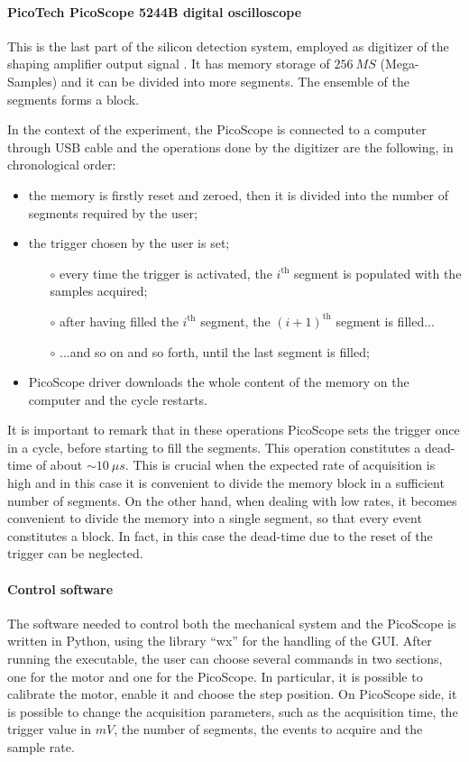 \documentclass[../../main/main.tex]{subfiles}
\begin{document}
\paragraph{PicoTech PicoScope 5244B digital oscilloscope}
This is the last part of the silicon detection system, employed as digitizer of the shaping amplifier output signal \cite{picoscope_5000}. It has memory storage of \( 256 \ \si{MS} \) (Mega-Samples) and it can be divided into more segments. The ensemble of the segments forms a block.

In the context of the experiment, the PicoScope is connected to a computer through USB cable and the operations done by the digitizer are the following, in chronological order:
\begin{itemize}
    \item the memory is firstly reset and zeroed, then it is divided into the number of segments required by the user;
    \item the trigger chosen by the user is set;
    \begin{itemize}[noitemsep,topsep=0pt,parsep=5pt,partopsep=0pt]%
        \item[\( \circ \)] every time the trigger is activated, the \( i^{\text{th}} \) segment is populated with the samples acquired;
        \item[\( \circ \)] after having filled the \( i^{\text{th}} \) segment, the \( (i+1)^{\text{th}} \) segment is filled...
        \item[\( \circ \)] ...and so on and so forth, until the last segment is filled;
    \end{itemize}
    \item PicoScope driver downloads the whole content of the memory on the computer and the cycle restarts.
\end{itemize}
It is important to remark that in these operations PicoScope sets the trigger once in a cycle, before starting to fill the segments. This operation constitutes a dead-time of about \( \sim 10 \ \si{\mu s} \). This is crucial when the expected rate of acquisition is high and in this case it is convenient to divide the memory block in a sufficient number of segments. On the other hand, when dealing with low rates, it becomes convenient to divide the memory into a single segment, so that every event constitutes a block. In fact, in this case the dead-time due to the reset of the trigger can be neglected.


\paragraph{Control software}
The software needed to control both the mechanical system and the PicoScope is written in Python, using the library ``wx'' for the handling of the GUI. After running the executable, the user can choose several commands in two sections, one for the motor and one for the PicoScope. In particular, it is possible to calibrate the motor, enable it and choose the step position. On PicoScope side, it is possible to change the acquisition parameters, such as the acquisition time, the trigger value in \( \si{mV} \), the number of segments, the events to acquire and the sample rate.
\end{document}
